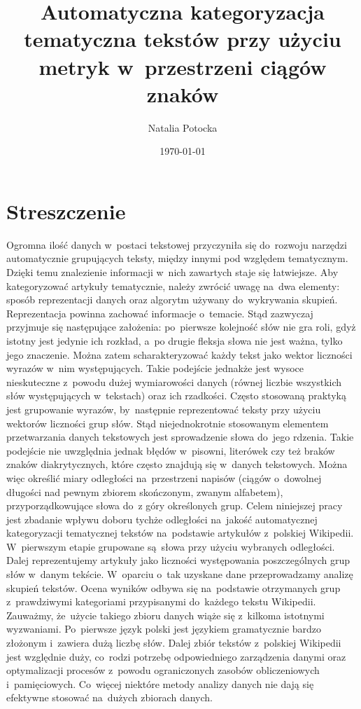 \documentclass{praca1}
\author{Natalia Potocka}
\title{Automatyczna kategoryzacja tematyczna tekstów przy użyciu metryk w~przestrzeni ciągów znaków}
\date{\today}
\begin{document}
\maketitle


\section*{Streszczenie}

Ogromna ilość danych w~postaci tekstowej przyczyniła się do~rozwoju narzędzi automatycznie grupujących teksty, między innymi pod względem tematycznym. Dzięki temu znalezienie informacji w~nich zawartych staje się łatwiejsze. Aby kategoryzować artykuły tematycznie, należy zwrócić uwagę na~dwa elementy: sposób reprezentacji danych oraz algorytm używany do~wykrywania skupień. Reprezentacja powinna zachować informacje o~temacie. Stąd zazwyczaj przyjmuje się następujące założenia: po~pierwsze kolejność słów nie gra roli, gdyż istotny jest jedynie ich rozkład, a~po drugie fleksja słowa nie jest ważna, tylko jego znaczenie. Można zatem scharakteryzować każdy tekst jako wektor liczności wyrazów w~nim występujących. Takie podejście jednakże jest wysoce nieskuteczne z~powodu dużej wymiarowości danych (równej liczbie wszystkich słów występujących w~tekstach) oraz ich rzadkości. Często stosowaną praktyką jest grupowanie wyrazów, by~następnie reprezentować teksty przy użyciu wektorów liczności grup słów. Stąd niejednokrotnie stosowanym elementem przetwarzania danych tekstowych jest sprowadzenie słowa do~jego rdzenia. Takie podejście nie uwzględnia jednak błędów w~pisowni, literówek czy też braków znaków diakrytycznych, które często znajdują się w~danych tekstowych. Można więc określić miary odległości na~przestrzeni napisów (ciągów o~dowolnej długości nad pewnym zbiorem skończonym, zwanym alfabetem), przyporządkowujące słowa do~z góry określonych grup. Celem niniejszej pracy jest zbadanie wpływu doboru tychże odległości na~jakość automatycznej kategoryzacji tematycznej tekstów na~podstawie artykułów z~polskiej Wikipedii. W~pierwszym etapie grupowane są~słowa przy użyciu wybranych odległości. Dalej reprezentujemy artykuły jako liczności występowania poszczególnych grup słów w~danym tekście. W~oparciu o~tak uzyskane dane przeprowadzamy analizę skupień tekstów. Ocena wyników odbywa się na~podstawie otrzymanych grup z~prawdziwymi kategoriami przypisanymi do~każdego tekstu Wikipedii. Zauważmy, że~użycie takiego zbioru danych wiąże się z~kilkoma istotnymi wyzwaniami. Po~pierwsze język polski jest językiem gramatycznie bardzo złożonym i~zawiera dużą liczbę słów. Dalej zbiór tekstów z~polskiej Wikipedii jest względnie duży, co~rodzi potrzebę odpowiedniego zarządzenia danymi oraz optymalizacji procesów z~powodu ograniczonych zasobów obliczeniowych i~pamięciowych. Co~więcej niektóre metody analizy danych nie dają się efektywne stosować na~dużych zbiorach danych.
\end{document}
